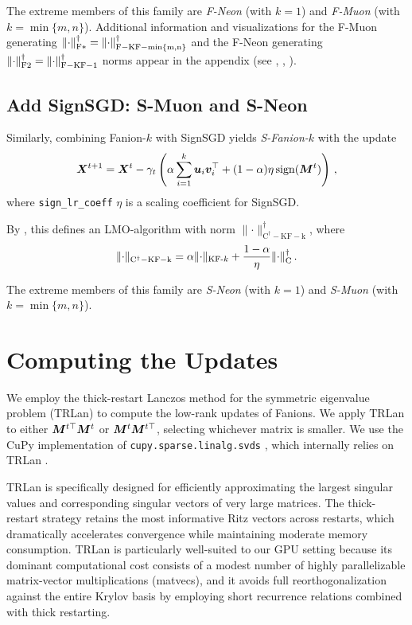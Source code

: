 \documentclass[pmlr]{jmlr}%
\newcommand{\norm}[1]{\lVert #1\rVert}
\DeclarePairedDelimiter{\normc}{\|}{\|_{\mathrm{C}}}
\DeclarePairedDelimiter{\normkfk}{\|}{\|_{\text{KF-}k}}
\DeclarePairedDelimiter{\normfstar}{\|}{\|_\mathrm{F*}}
\DeclarePairedDelimiter{\normftwo}{\|}{\|_\mathrm{F2}}
\begin{document}
 The extreme members of this family are \emph{F-Neon} (with $k = 1$) and \emph{F-Muon} (with $k = \min\{m, n\}$). Additional information and visualizations for the F-Muon generating $\normfstar{\cdot}^\dagger = \norm{\cdot}_{\mathrm{F-KF-\min\{m, n\}}}^\dagger$ and the F-Neon generating $\normftwo{\cdot}^\dagger = \norm{\cdot}_{\mathrm{F-KF-1}}^\dagger$ norms appear in the appendix (see , , ).
 
 \subsection{Add SignSGD: S-Muon and S-Neon}
 
 Similarly, combining Fanion-$k$ with SignSGD yields \emph{S-Fanion-$k$} with the update
 \begin{equation}\label{eq:sign_muon_update}
     {\bm{X}}^{t+1} = {\bm{X}}^{t} - \gamma_t \left(\alpha \sum_{i = 1}^k {\bm{u}}_i {\bm{v}}_i^\top + (1-\alpha)\eta\operatorname{sign}({\bm{M}}^t)\right)\,,
 \end{equation}
 where \texttt{sign\_lr\_coeff} $\eta$ is a scaling coefficient for SignSGD.
 
 By , this defines an LMO-algorithm with norm $\norm{\cdot}_{\mathrm{C^\dagger-KF-k}}^\dagger$, where
 \begin{equation}\label{eq:ckfk_norm}
   \norm{\cdot}_{\mathrm{C^\dagger-KF-k}} = \alpha \normkfk{\cdot} + \frac{1-\alpha}{\eta}\normc{\cdot}^\dagger\,.
 \end{equation}
 
 The extreme members of this family are \emph{S-Neon} (with $k = 1$) and \emph{S-Muon} (with $k = \min\{m, n\}$).
 
 \section{Computing the Updates}\label{sec:matrix-side}
 We employ the thick-restart Lanczos method for the symmetric eigenvalue problem (TRLan) to compute the low-rank updates of Fanions. We apply TRLan to either ${\bm{M}}^{t\top}{\bm{M}}^t$ or ${\bm{M}}^t {\bm{M}}^{t\top}$, selecting whichever matrix is smaller. We use the CuPy implementation of \texttt{cupy.sparse.linalg.svds} \citep{cupy_svds_ref}, which internally relies on TRLan \citep{simonz1998thick}.
 
 TRLan is specifically designed for efficiently approximating the largest singular values and corresponding singular vectors of very large matrices. The thick-restart strategy retains the most informative Ritz vectors across restarts, which dramatically accelerates convergence while maintaining moderate memory consumption. TRLan is particularly well-suited to our GPU setting because its dominant computational cost consists of a modest number of highly parallelizable matrix-vector multiplications (matvecs), and it avoids full reorthogonalization against the entire Krylov basis by employing short recurrence relations combined with thick restarting.
 
\end{document}
